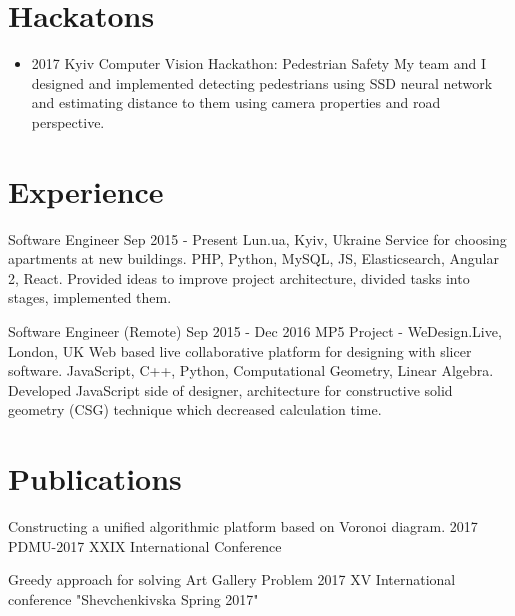 \documentclass[letterpaper]{twentysecondcv} %
\begin{document}

\section{Hackatons}
\begin{itemize}
    \item \projectItem
        {2017 Kyiv Computer Vision Hackathon: Pedestrian Safety }
        {My team and I designed and implemented detecting pedestrians using SSD neural network and estimating distance to them using camera properties and road perspective.}
\end{itemize}

\section{Experience}

\begin{twenty} %
	\twentyitemwithoutbegin
    	{}
        {Software Engineer}
        {Sep 2015 - Present}
        {Lun.ua, Kyiv, Ukraine}
        {Service for choosing apartments at new buildings.
        {PHP, Python, MySQL, JS, Elasticsearch, Angular 2, React. Provided ideas to improve project architecture, divided tasks into stages, implemented them.
        }
    }

    \twentyitemwithoutbegin
   	    {}
        {Software Engineer (Remote)}
        {Sep 2015 - Dec 2016 }
        {MP5 Project - WeDesign.Live, London, UK}
        {Web based live collaborative platform for designing with slicer software.
        {JavaScript, C++, Python, Computational Geometry, Linear Algebra. Developed JavaScript side of designer, architecture for constructive solid geometry (CSG) technique which decreased calculation time.
        }
        }
\end{twenty}
\section{Publications}
\begin{twenty}
	\twentyitemwithoutbegin
    	{}
        {Constructing a unified algorithmic platform based on Voronoi diagram.}
        {2017}
        {PDMU-2017 XXIX International Conference}
        {}
        \end{twenty}
\begin{twenty}
	\twentyitemwithoutbegin
    	{}
        {Greedy approach for solving Art Gallery Problem}
        {2017}
        {XV International conference "Shevchenkivska Spring 2017"}
        {}
\end{twenty}
\end{document}
